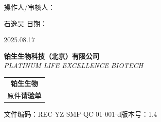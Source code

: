 \documentclass[UTF8,10pt,a4paper,fontset=fandol]{ctexart}
\newcommand{\fieldvalue}[1]{#1}
\newcommand{\handwritten}[1]{#1}
\begin{document}
\vfill

\noindent
操作人/审核人：

\fieldvalue{\handwritten{石逸昊}}
\hfill
日期：

\fieldvalue{\handwritten{2025.08.17}}

\newpage

\begin{center}
\textbf{铂生生物科技（北京）有限公司}\\
\textit{PLATINUM LIFE EXCELLENCE BIOTECH}\\[2pt]
\begin{tabular}{c}
\textbf{铂生生物}\\
原件\quad \textbf{请验单}
\end{tabular}
\hfill
文件编码：REC-YZ-SMP-QC-01-001-d\qquad 版本号：1.4
\end{center}
\end{document}
